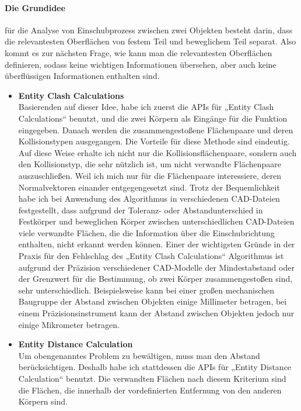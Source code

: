 \documentclass[14pt,a4paper,titlepage]{article}
\begin{document}
			\paragraph{Die Grundidee}
			für die Analyse von Einschubprozess zwischen zwei Objekten besteht darin, dass die relevantesten Oberflächen von festem Teil und beweglichem Teil separat. Also kommt es zur nächsten Frage, wie kann man die relevantesten Oberflächen definieren, sodass keine wichtigen Informationen übersehen, aber auch keine überflüssigen Informationen enthalten sind.
			\begin{itemize}
				\item 
				\textbf{Entity Clash Calculations}
				\\
				Basierenden auf dieser Idee, habe ich zuerst die APIs für „Entity Clash Calculations“ benutzt, und die zwei Körpern als Eingänge für die Funktion eingegeben. Danach werden die zusammengestoßene Flächenpaare und deren Kollisionstypen ausgegangen. Die Vorteile für diese Methode sind eindeutig. Auf diese Weise erhalte ich nicht nur die Kollisionsflächenpaare, sondern auch den Kollisionstyp, die sehr nützlich ist, um nicht verwandte Flächenpaare auszuschließen. Weil ich mich nur für die Flächenpaare interessiere, deren Normalvektoren einander entgegengesetzt sind. \bigbreak Trotz der Bequemlichkeit habe ich bei Anwendung des Algorithmus in verschiedenen CAD-Dateien festgestellt, dass aufgrund der Toleranz- oder Abstandunterschied in Festkörper und beweglichen Körper zwischen unterschiedlichen CAD-Dateien viele verwandte Flächen, die die Information über die Einschubrichtung enthalten, nicht erkannt werden können. Einer der wichtigsten Gründe in der Praxis für den Fehlschlag des „Entity Clash Calculations“ Algorithmus ist aufgrund der Präzision verschiedener CAD-Modelle der Mindestabstand oder der Grenzwert für die Bestimmung, ob zwei Körper zusammengestoßen sind, sehr unterschiedlich. Beispielsweise kann bei einer großen mechanischen Baugruppe der Abstand zwischen Objekten einige Millimeter betragen, bei einem Präzisionsinstrument kann der Abstand zwischen Objekten jedoch nur einige Mikrometer betragen.
				
				\item 
				\textbf{Entity Distance Calculation}
				\\ 
				Um obengenanntes Problem zu bewältigen, muss man den Abstand berücksichtigen. Deshalb habe ich stattdessen die APIs für „Entity Distance Calculation“ benutzt. Die verwandten Flächen nach diesem Kriterium sind die Flächen, die innerhalb der vordefinierten Entfernung von den anderen Körpern sind.   
			\end{itemize}
\end{document}
